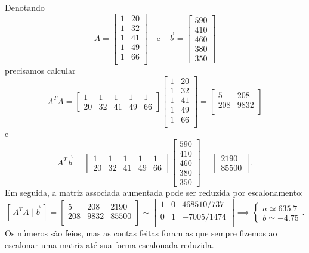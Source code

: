 \documentclass[../livro.tex]{subfiles}  %
\begin{document}
\begin{example}
  Denotando
  \[
  A =
  \begin{bmatrix}
    1 & 20 \\
    1 & 32 \\
    1 & 41 \\
    1 & 49 \\
    1 & 66 \\
  \end{bmatrix} \quad \text{e} \quad
  \vec{b} =
  \begin{bmatrix}
    590 \\ 410 \\ 460 \\ 380 \\ 350
  \end{bmatrix}
  \] precisamos calcular
  \[
  A^T A =
  \begin{bmatrix}
    1 & 1 & 1 & 1 & 1 \\
    20 & 32 & 41 & 49 & 66
  \end{bmatrix}
  \begin{bmatrix}
    1 & 20 \\
    1 & 32 \\
    1 & 41 \\
    1 & 49 \\
    1 & 66 \\
  \end{bmatrix} =
  \begin{bmatrix}
    5    & 208 \\
    208  & 9832  \\
  \end{bmatrix}
  \] e
  \[
  A^T \vec{b} =
  \begin{bmatrix}
    1 & 1 & 1 & 1 & 1 \\
    20 & 32 & 41 & 49 & 66
  \end{bmatrix}
  \begin{bmatrix}
    590 \\ 410 \\ 460 \\ 380 \\ 350
  \end{bmatrix} =
  \begin{bmatrix}
    2190 \\ 85500
  \end{bmatrix}.
  \] Em seguida, a matriz associada aumentada pode ser reduzida por escalonamento:
  \[
  [\, A^TA \ | \ \vec{b} \, ] =
  \begin{bmatrix}
    5    & 208 & 2190 \\
    208  & 9832 & 85500 \\
  \end{bmatrix} \sim
  \begin{bmatrix}
    1 & 0 & 468510/737 \\
    0 & 1 & -7005/1474 \\
  \end{bmatrix} \implies
  \left\{
    \begin{array}{ll}
      a \simeq 635.7 \\
      b \simeq -4.75
    \end{array}
  \right..
  \] Os números são feios, mas as contas feitas foram as que sempre fizemos ao escalonar uma matriz até sua forma escalonada reduzida.


\end{example}
\end{document}
